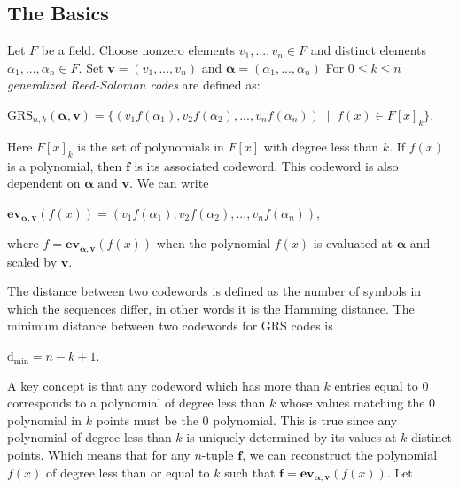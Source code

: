 \documentclass{article}
\begin{document}

\subsection{The Basics}
Let $F$ be a field. Choose nonzero elements $v_{1},..., v_{n} \in F$ and distinct elements $\alpha_{1},...,\alpha_{n} \in F$. Set $\textbf{v} = (v_{1},..., v_{n})$ and $\boldsymbol\alpha = (\alpha_{1},...,\alpha_{n})$ For $0 \le k \le n$ \textit{generalized Reed-Solomon codes} are defined as:
\begin{center}
$\text{GRS}_{n,k}(\boldsymbol\alpha, \textbf{v}) = \{(v_{1}f(\alpha_{1}),v_{2}f(\alpha_{2}),...,v_{n}f(\alpha_{n}))\;\mid\;f(x) \in F[x]_{k}\}$.
\end{center}
Here $F[x]_{k}$ is the set of polynomials in $F[x]$ with degree less than $k$. If $f(x)$ is a polynomial, then $\textbf{f}$ is its associated codeword. This codeword is also dependent on $\boldsymbol\alpha \text{ and } \textbf{v}$. We can write

\begin{center}
$\textbf{ev}_{\boldsymbol\alpha,\textbf{v}}(f(x)) = (v_{1}f(\alpha_{1}),v_{2}f(\alpha_{2}),...,v_{n}f(\alpha_{n}))$,
\end{center}
where $f = \textbf{ev}_{\boldsymbol\alpha,\textbf{v}}(f(x))$ when the polynomial $f(x)$ is evaluated at $\boldsymbol\alpha$ and scaled by $\textbf{v}$.

The distance between two codewords is defined as the number of symbols in which the sequences differ, in other words it is the Hamming distance. The minimum distance between two codewords for GRS codes is

\begin{center}
$\text{d}_{\text{min}} = n - k + 1$.
\end{center}

A key concept is that any codeword which has more than $k$ entries equal to 0 corresponds to a polynomial of degree less than $k$ whose values matching the 0 polynomial in $k$ points must be the 0 polynomial. This is true since any polynomial of degree less than $k$ is uniquely determined by its values at $k$ distinct points. Which means that for any $n$-tuple $\textbf{f}$, we can reconstruct the polynomial $f(x)$ of degree less than or equal to $k$ such that $\textbf{f} = \textbf{ev}_{\boldsymbol\alpha,\textbf{v}}(f(x))$. Let
\end{document}
